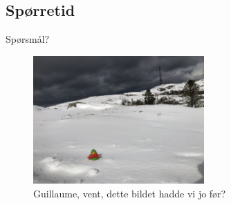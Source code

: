 \subsection*{Spørretid}
\begin{frame}{Spørsmål?}
    \begin{figure}
        \centering
        \includegraphics[height = 4.9cm]{images/guillaume7.jpg}
        \caption{Guillaume, vent, dette bildet hadde vi jo før?}
        \label{fig:guillaume7b}
    \end{figure}
\end{frame}